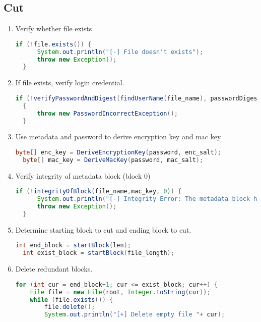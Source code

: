 \documentclass[a4paper,10pt]{article}
\begin{document}
\subsection{Cut} %
\label{sub:Cut}
\begin{enumerate}
\item Verify whether file exists
  \begin{lstlisting}[linewidth=.5\columnwidth,breaklines=true,language=Java]
  if (!file.exists()) {
      System.out.println("[-] File doesn't exists");
      throw new Exception();
  }\end{lstlisting}
  \item If file exists, verify login credential.
  \begin{lstlisting}[linewidth=\columnwidth,breaklines=true,language=Java]
  if (!verifyPasswordAndDigest(findUserName(file_name), passwordDigest, passwd_salt, password))
  {
      throw new PasswordIncorrectException();    
  }\end{lstlisting}
  \item Use metadata and password to derive encryption key and mac key
  \begin{lstlisting}[linewidth=.5\columnwidth,breaklines=true,language=Java]
  byte[] enc_key = DeriveEncryptionKey(password, enc_salt);
  byte[] mac_key = DeriveMacKey(password, mac_salt);\end{lstlisting}
  \item Verify integrity of metadata block (block 0)
  \begin{lstlisting}[linewidth=\columnwidth,breaklines=true,language=Java]
  if (!integrityOfBlock(file_name,mac_key, 0)) {
      System.out.println("[-] Integrity Error: The metadata block has been modified");
      throw new Exception();
  }\end{lstlisting}
  \item Determine starting block to cut and ending block to cut.
  \begin{lstlisting}[linewidth=\columnwidth,breaklines=true,language=Java]
  int end_block = startBlock(len);
  int exist_block = startBlock(file_length);\end{lstlisting}
  \item Delete redundant blocks.
  \begin{lstlisting}[linewidth=\columnwidth,breaklines=true,language=Java]
  for (int cur = end_block+1; cur <= exist_block; cur++) {
    File file = new File(root, Integer.toString(cur));
    while (file.exists()) {
        file.delete();
        System.out.println("[+] Delete empty file "+ cur);

\end{lstlisting}
\end{enumerate}
\end{document}

